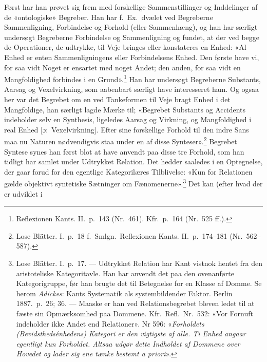 \documentclass[12pt,a4paper]{article}
\begin{document}
Først har han prøvet sig frem med forskellige Sammenstillinger og
Inddelinger af de «ontologiske» Begreber. Han har f.\ Ex.\ dvælet ved
Begreberne Sammenligning, Forbindelse og Forhold (eller Sammenhæng), og
han har særligt undersøgt Begreberne Forbindelse og Sammenligning og
fundet, at der ved begge de Operationer, de udtrykke, til Veje bringes
eller konstateres en Enhed: «Al Enhed er enten Sammenligningens eller
Forbindelsens Enhed. Den første have vi, for saa vidt Noget er ensartet
med noget Andet; den anden, for saa vidt en Mangfoldighed forbindes i en
Grund».\footnote{Reflexionen Kants. II.\ p.\ 143 (Nr.\ 461).
Kfr.\ p.\ 164 (Nr.\ 525 ff.).} Han har undersøgt Begreberne Substants,
Aarsag og Vexelvirkning, som aabenbart særligt have interesseret ham. Og
ogsaa her var det Begrebet om en ved Tankeformen til Veje bragt Enhed i
det Mangfoldige, han særligt lagde Mærke til; «Begrebet Substants og
Accidents indeholder selv en Synthesis, ligeledes Aarsag og Virkning, og
Mangfoldighed i real Enhed [ɔ:\ Vexelvirkning]. Efter sine forskellige
Forhold til den indre Sans maa nu Naturen nødvendigvis staa under en af
disse Synteser».\footnote{Lose Blätter. I.\ p.\ 18 f.\ Smlgn.\
Reflexionen Kants. II.\ p.\ 174--181 (Nr.\ 562--587).} Begrebet
Syntese synes han først blot at have anvendt paa disse tre Forhold, som
han tidligt har samlet under Udtrykket Relation. Det hedder saaledes i en
Optegnelse, der gaar forud for den egentlige Kategorilæres Tilblivelse:
«Kun for Relationen gælde objektivt syntetiske Sætninger om
Fænomenerne».\footnote{Lose Blätter. I.\ p.\ 17. --- Udtrykket
Relation har Kant vistnok hentet fra den aristoteliske Kategoritavle. Han
har anvendt det paa den ovenanførte Kategorigruppe, før han brugte det
til Betegnelse for en Klasse af Domme. Se herom \emph{Adickes}: Kants
Systematik als systembildender Faktor. Berlin 1887.\ p.\ 26; 36. ---
Maaske er han ved Relationsbegrebet bleven ledet til at fæste sin
Opmærksomhed paa Dommene. Kfr.\ Refl.\ Nr.\ 532: «Vor Fornuft indeholder
ikke Andet end Relationer». Nr 596: «\emph{Forholdets (Bevidsthedsénhedens)
Kategori er den vigtigste af alle. Ti Enhed angaar egentligt kun
Forholdet. Altsaa udgør dette Indholdet af Dommene over Hovedet og lader
sig ene tænke bestemt a priori}».} Det kan (efter hvad der er udviklet i
\end{document}
